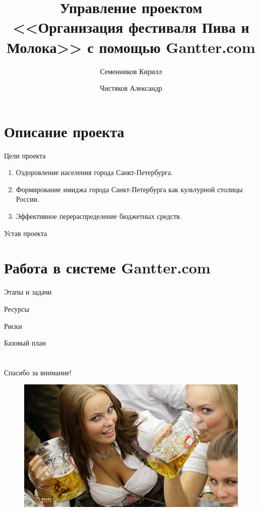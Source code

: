 \documentclass[10pt,pdf,hyperref=unicode,hyperref={bookmarks=false}]{beamer}
\title[Организация фестиваля Пива и Молока]{Управление проектом <<Организация фестиваля Пива и Молока>> с помощью Gantter.com}
\author{Семенников Кирилл\and Чистяков Александр}
\institute{Санкт-Петербургский национальный исследовательский университет информационных технологий, механики и оптики}
\begin{document}
  \begin{frame}
    \maketitle
  \end{frame}
  \section{Описание проекта}
    \begin{frame}{Цели проекта}
      \begin{enumerate}
        \item{Оздоровление населения города Санкт-Петербурга.}
        \item{Формирование имиджа города Санкт-Петербурга как культурной столицы России.}
        \item{Эффективное перераспределение бюджетных средств.}
      \end{enumerate}
    \end{frame} 
    \begin{frame}{Устав проекта}
    \end{frame}
  \section{Работа в системе Gantter.com}
    \begin{frame}{Этапы и задачи}
    \end{frame}
    \begin{frame}{Ресурсы}
    \end{frame}
    \begin{frame}{Риски}
    \end{frame}
    \begin{frame}{Базовый план}
    \end{frame}
  \section*{}
  \begin{frame}{Спасибо за внимание!}
    \begin{figure}
      \includegraphics[width=\textwidth]{beers1.jpg}
    \end{figure}
  \end{frame}
\end{document}
